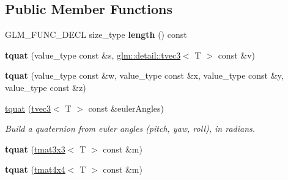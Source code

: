 \subsection*{Public Member Functions}
\begin{DoxyCompactItemize}
\item 
\hypertarget{structglm_1_1detail_1_1tquat_a1611e6cc2bc5e0d08604d6a0c14a5ccc}{}G\+L\+M\+\_\+\+F\+U\+N\+C\+\_\+\+D\+E\+C\+L size\+\_\+type {\bfseries length} () const \label{structglm_1_1detail_1_1tquat_a1611e6cc2bc5e0d08604d6a0c14a5ccc}

\item 
\hypertarget{structglm_1_1detail_1_1tquat_ad7d9f5911f3b5753d6dfdb7ccd25fbb8}{}{\bfseries tquat} (value\+\_\+type const \&s, \hyperlink{structglm_1_1detail_1_1tvec3}{glm\+::detail\+::tvec3}$<$ T $>$ const \&v)\label{structglm_1_1detail_1_1tquat_ad7d9f5911f3b5753d6dfdb7ccd25fbb8}

\item 
\hypertarget{structglm_1_1detail_1_1tquat_acef752b329f028e2f1c3e9f1e35809d5}{}{\bfseries tquat} (value\+\_\+type const \&w, value\+\_\+type const \&x, value\+\_\+type const \&y, value\+\_\+type const \&z)\label{structglm_1_1detail_1_1tquat_acef752b329f028e2f1c3e9f1e35809d5}

\item 
\hypertarget{structglm_1_1detail_1_1tquat_a2ee7f0a62a6de508aeb2b2bc1b7f4023}{}\hyperlink{structglm_1_1detail_1_1tquat_a2ee7f0a62a6de508aeb2b2bc1b7f4023}{tquat} (\hyperlink{structglm_1_1detail_1_1tvec3}{tvec3}$<$ T $>$ const \&euler\+Angles)\label{structglm_1_1detail_1_1tquat_a2ee7f0a62a6de508aeb2b2bc1b7f4023}

\begin{DoxyCompactList}\small\item\em Build a quaternion from euler angles (pitch, yaw, roll), in radians. \end{DoxyCompactList}\item 
\hypertarget{structglm_1_1detail_1_1tquat_ac0fcf8983500fac2a2f5862eb511ddb9}{}{\bfseries tquat} (\hyperlink{structglm_1_1detail_1_1tmat3x3}{tmat3x3}$<$ T $>$ const \&m)\label{structglm_1_1detail_1_1tquat_ac0fcf8983500fac2a2f5862eb511ddb9}

\item 
\hypertarget{structglm_1_1detail_1_1tquat_aad341bf8700b9abee6daff3deda4c954}{}{\bfseries tquat} (\hyperlink{structglm_1_1detail_1_1tmat4x4}{tmat4x4}$<$ T $>$ const \&m)\label{structglm_1_1detail_1_1tquat_aad341bf8700b9abee6daff3deda4c954}


\end{DoxyCompactItemize}
